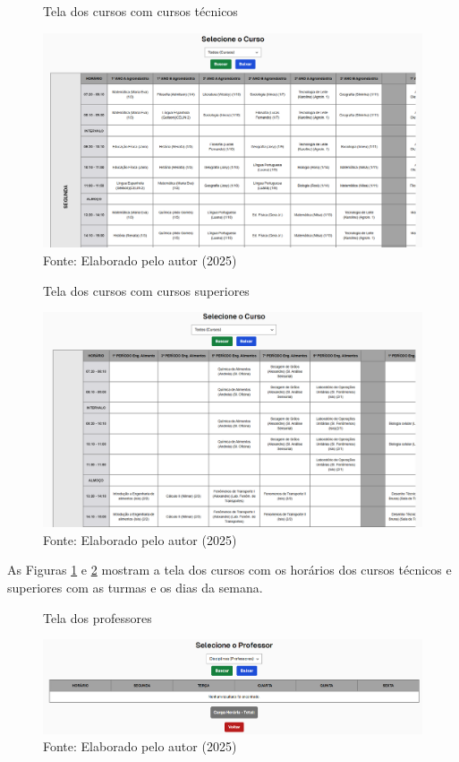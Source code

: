 \begin{figure}[htb]
    \centering
    \caption{Tela dos cursos com cursos técnicos}
    \includegraphics[width=1\textwidth]{Figuras/front-3.png}
    \caption*{Fonte: Elaborado pelo autor (2025)}
    \label{fig_front_3}
\end{figure}

\begin{figure}[H]
    \centering
    \caption{Tela dos cursos com cursos superiores}
    \includegraphics[width=1\textwidth]{Figuras/front-4.png}
    \caption*{Fonte: Elaborado pelo autor (2025)}
    \label{fig_front_4}
\end{figure}

As Figuras \ref{fig_front_3} e \ref{fig_front_4} mostram a tela dos cursos com os horários dos cursos técnicos e superiores com as turmas e os dias da semana.

\begin{figure}[htb]
    \centering
    \caption{Tela dos professores}
    \includegraphics[width=1\textwidth]{Figuras/front-5.png}
    \caption*{Fonte: Elaborado pelo autor (2025)}
    \label{fig_front_5}
\end{figure}

